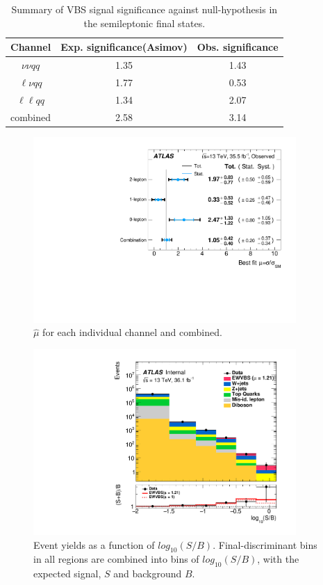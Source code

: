 \begin{table}[htb] 
	\centering
	\begin{tabular}{ccc}
		\hline
		Channel  & Exp. significance(Asimov) & Obs. significance  \\ 
		\hline
		$\nu\nu qq$ & 1.35 & 1.43 \\
		$\ell\nu qq$ & 1.77 & 0.53 \\
		$\ell\ell qq$ & 1.34 & 2.07 \\
		combined & 2.58  & 3.14 \\
		\hline 
	\end{tabular}
	\caption{Summary of VBS signal significance against null-hypothesis in the semileptonic final states.}
	\label{tab:significance_sbfit_obs}  
\end{table}
\begin{figure}[!h]
	\begin{centering}
		\includegraphics[width=10cm]{Chapter5/Muhat_VBS_channels_obs.pdf} 
		\caption{$\hat{\mu}$ for each individual channel and combined.}
		\label{fig:fit_mu_VBS_obs}  
	\end{centering}
\end{figure}
\begin{figure}[!h]
	\begin{centering}
		\includegraphics[width=10cm]{Chapter5/Global_SoverB_2016.pdf} 
		\caption{Event yields as a function of $log_{10}(S/B)$. Final-discriminant bins in all regions are combined into bins of
			$log_{10}(S/B)$, with the expected signal, $S$ and background $B$.}
		\label{fig:SoBplot_obs}  
	\end{centering}
\end{figure}
